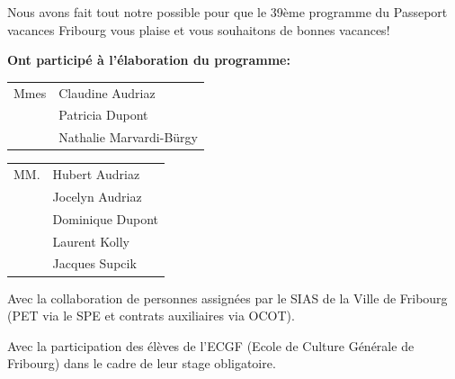\cleardoublepage
Nous avons fait tout notre possible pour que le 39ème programme du Passeport vacances Fribourg vous plaise et vous souhaitons de bonnes vacances!
	
\textbf{Ont participé à l'élaboration du programme:}

\begin{tabular}{p{1.6cm} l}
Mmes & Claudine Audriaz \\
& Patricia Dupont \\
& Nathalie Marvardi-Bürgy \\
\end{tabular}

\begin{tabular}{p{1.6cm} l}
	MM. & Hubert Audriaz \\
	& Jocelyn Audriaz \\
	& Dominique Dupont \\
	& Laurent Kolly \\
	& Jacques Supcik \\
\end{tabular}

Avec la collaboration de personnes assignées par le SIAS de la Ville de Fribourg (PET via le SPE et contrats auxiliaires via OCOT). 

Avec la participation des élèves de l'ECGF (Ecole de Culture Générale de Fribourg) dans le cadre de leur stage obligatoire.




\clearpage%
\thispagestyle{empty}%
